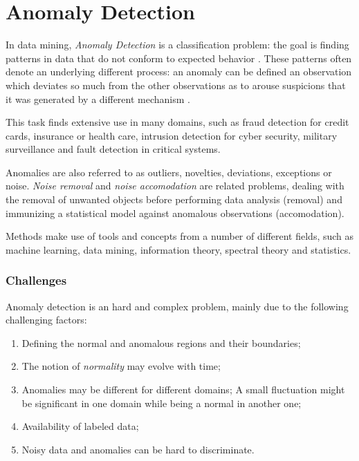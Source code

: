 \chapter{Anomaly Detection}

In data mining, \textit{Anomaly Detection} is a classification problem: the goal is finding patterns in data that do not conform to expected behavior \cite{chandola2009anomaly}. These patterns often denote an underlying different process: an anomaly can be defined an observation which deviates so much from the other observations as to arouse suspicions that it was generated by a different mechanism \cite{hawkins1980identification}.

This task finds extensive use in many domains, such as fraud detection for credit cards, insurance or health care, intrusion detection for cyber security, military surveillance and fault detection in critical systems.

Anomalies are also referred to as outliers, novelties, deviations, exceptions or noise. \textit{Noise removal} and \textit{noise accomodation} are related problems, dealing with the removal of unwanted objects before performing data analysis (removal) and immunizing a statistical model against anomalous observations (accomodation).

Methods make use of tools and concepts from a number of different fields, such as machine learning, data mining, information theory, spectral theory and statistics.

\subsection{Challenges}

Anomaly detection is an hard and complex problem, mainly due to the following challenging factors:

\begin{enumerate}
	\item Defining the normal and anomalous regions and their boundaries;
	\item The notion of \textit{normality} may evolve with time;
	\item Anomalies may be different for different domains; A small fluctuation might be significant in one domain while being a normal in another one;
	\item Availability of labeled data;
	\item Noisy data and anomalies can be hard to discriminate.
\end{enumerate}

